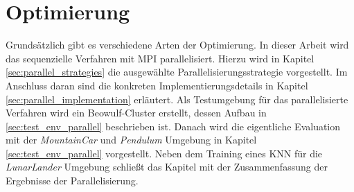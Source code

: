 \chapter{Optimierung}
\label{chap:optimization}
Grundsätzlich gibt es verschiedene Arten der Optimierung. In dieser Arbeit wird das sequenzielle Verfahren mit \ac{MPI} parallelisiert. Hierzu wird in Kapitel \ref{sec:parallel_strategies} die ausgewählte Parallelisierungsstrategie vorgestellt. Im Anschluss daran sind die konkreten Implementierungsdetails in Kapitel \ref{sec:parallel_implementation} erläutert. Als Testumgebung für das parallelisierte Verfahren wird ein Beowulf-Cluster erstellt, dessen Aufbau in \ref{sec:test_env_parallel} beschrieben ist. Danach wird die eigentliche Evaluation mit der \emph{MountainCar} und \emph{Pendulum} Umgebung in Kapitel \ref{sec:test_env_parallel} vorgestellt. Neben dem Training eines \ac{KNN} für die \emph{LunarLander} Umgebung schließt das Kapitel mit der Zusammenfassung der Ergebnisse der Parallelisierung.








